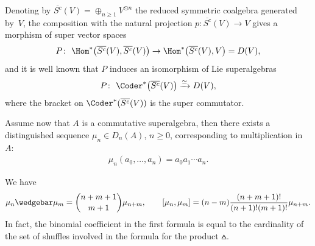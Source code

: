 \begin{Remark}\label{rem.coderivationNR}
Denoting by $\overline{S^c}(V)=\oplus_{n\ge 1} V^{\odot n}$ the reduced symmetric coalgebra generated by~$V$,
the composition with the natural projection $p\colon \overline{S^c}(V)\to V$ gives a morphism of super vector spaces
\begin{gather*} P\colon \ \Hom^*\big(\overline{S^c}(V),\overline{S^c}(V)\big)\to \Hom^*\big(\overline{S^c}(V),V\big)=D(V),\end{gather*}
and it is well known \cite{LadaMarkl} that $P$ induces an isomorphism of Lie superalgebras
\begin{gather*} P\colon \ \Coder^*\big(\overline{S^c}(V)\big)\xrightarrow{\simeq} D(V),\end{gather*}
where the bracket on $\Coder^*(\overline{S^c}(V))$ is the super commutator.
\end{Remark}

Assume now that $A$ is a commutative superalgebra, then there exists a distinguished sequence $\mu_n\in D_n(A)$, $n\ge 0$, corresponding to multiplication in~$A$:
\begin{gather*} \mu_n(a_0,\ldots,a_n)=a_0a_1\cdots a_n .\end{gather*}

We have
\begin{gather}\label{equ.bracketmuenne}
\mu_n\wedgebar \mu_m=\dbinom{n+m+1}{m+1}\mu_{n+m},\qquad
[\mu_n,\mu_m]=(n-m)\dfrac{(n+m+1)!}{(n+1)!(m+1)!}
\mu_{n+m} .\end{gather}
In fact, the binomial coef\/f\/icient in the f\/irst formula is equal to the cardinality of the set of shuf\/f\/les involved in the formula for the product $\wedgebar$.

